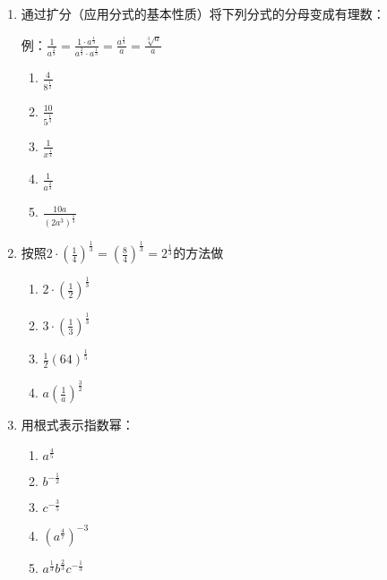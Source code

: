 \begin{enumerate}
\item 通过扩分（应用分式的基本性质）将下列分式的分母变成有理数：

例：$\frac{1}{a^{\tfrac{2}{3}}}=\frac{1\cdot a^{\tfrac{1}{3}}}{a^{\tfrac{2}{3}}\cdot a^{\tfrac{1}{3}}}=\frac{a^{\tfrac{1}{3}}}{a}=\frac{\sqrt[3]{a}}{a}$
\begin{multicols}{3}
    \begin{enumerate}
\item $\frac{4}{8^{\tfrac{1}{2}}}$
\item $\frac{10}{5^{\tfrac{1}{3}}}$
\item $\frac{1}{x^{\tfrac{1}{4}}}$
\item $\frac{1}{a^{\tfrac{2}{3}}}$
\item $\frac{10a}{(2a^3)^{\tfrac{1}{3}}}$
    \end{enumerate}
\end{multicols}

\item 按照$2\cdot \left(\frac{1}{4}\right)^{\tfrac{1}{3}}=\left(\frac{8}{4}\right)^{\tfrac{1}{3}}=2^{\tfrac{1}{3}}$的方法做
\begin{multicols}{2}
    \begin{enumerate}
\item $2\cdot \left(\frac{1}{2}\right)^{\tfrac{1}{3}}$
\item $3\cdot \left(\frac{1}{3}\right)^{\tfrac{1}{3}}$
\item $\frac{1}{2} \left(64\right)^{\tfrac{1}{5}}$
\item $a \left(\frac{1}{a}\right)^{\tfrac{3}{2}}$
    \end{enumerate}
\end{multicols}
\item 用根式表示指数幂：
\begin{multicols}{3}
    \begin{enumerate}
\item $a^{\tfrac{4}{5}}$
\item $b^{-\tfrac{1}{2}}$
\item $c^{-\tfrac{3}{5}}$
\item $\left(a^{\tfrac{4}{7}}\right)^{-3}$
\item $a^{\tfrac{1}{3}}b^{\tfrac{2}{3}}c^{-\tfrac{1}{3}}$
    \end{enumerate}
\end{multicols}


\end{enumerate}
